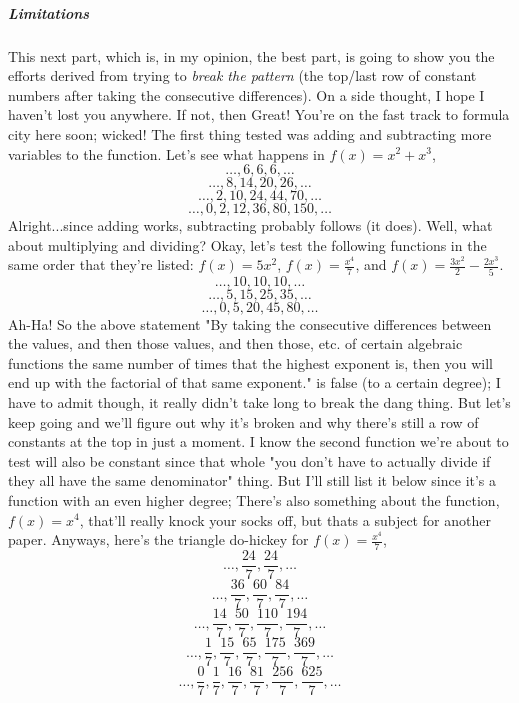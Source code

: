 \documentclass[12pt, letterpaper]{report}
\begin{document}
\subparagraph{Limitations}This next part, which is, in my opinion, the best part, is going to show you the efforts derived from trying to \textit{break the pattern} (the top/last row of constant numbers after taking the consecutive differences). On a side thought, I hope I haven't lost you anywhere. If not, then Great! You're on the fast track to formula city here soon; wicked! The first thing tested was  adding and subtracting more variables to the function. Let's see what happens in $f(x)=x^2+x^3$,
$$\dots, 6, 6, 6, \dots$$
$$\dots, 8, 14, 20, 26, \dots$$
$$\dots, 2, 10, 24, 44, 70, \dots$$
\begin{equation}\dots, 0, 2, 12, 36, 80, 150, \dots\end{equation}
Alright...since adding works, subtracting probably follows (it does). Well, what about multiplying and dividing? Okay, let's test the following functions in the same order that they're listed: $f(x)=5x^2$, $f(x)=\frac{x^4}{7}$, and $f(x)=\frac{3x^2}{2}-\frac{2x^3}{5}$.
$$\dots, 10, 10, 10, \dots$$
$$\dots, 5, 15, 25, 35, \dots$$
\begin{equation}\dots, 0, 5, 20, 45, 80, \dots\end{equation}
Ah-Ha! So the above statement "By taking the consecutive differences between the values, and then those values, and then those, etc. of certain algebraic functions the same number of times that the highest exponent is, then you will end up with the factorial of that same exponent." is false (to a certain degree); I have to admit though, it really didn't take long to break the dang thing. But let's keep going and we'll figure out why it's broken and why there's still a row of constants at the top in just a moment. I know the second function we're about to test will also be constant since that whole "you don't have to actually divide if they all have the same denominator" thing. But I'll still list it below since it's a function with an even higher degree; There's also something about the function, $f(x)=x^4$, that'll really knock your socks off, but thats a subject for another paper. Anyways, here's the triangle do-hickey for $f(x)=\frac{x^4}{7}$,
$$\dots, \frac{24}{7}, \frac{24}{7}, \dots$$
$$\dots, \frac{36}{7}, \frac{60}{7}, \frac{84}{7}, \dots$$
$$\dots, \frac{14}{7}, \frac{50}{7}, \frac{110}{7}, \frac{194}{7}, \dots$$
$$\dots, \frac{1}{7}, \frac{15}{7}, \frac{65}{7}, \frac{175}{7}, \frac{369}{7}, \dots$$
\begin{equation}\dots, \frac{0}{7}, \frac{1}{7}, \frac{16}{7}, \frac{81}{7}, \frac{256}{7}, \frac{625}{7}, \dots\end{equation}
\end{document}
